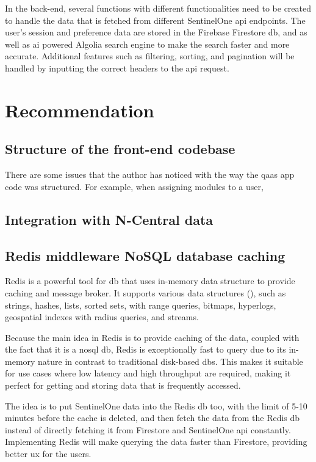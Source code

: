 \begin{multicols}{2}
  In the back-end, several functions with different functionalities need to be created to handle the data that is fetched from different
  SentinelOne \acrshort{api} endpoints. The user's session and preference data are stored in the Firebase Firestore \acrshort{db}, and as
  well as \acrshort{ai} powered Algolia search engine to make the search faster and more accurate. Additional features such as filtering,
  sorting, and pagination will be handled by inputting the correct headers to the \acrshort{api} request.

  \section{Recommendation}

  \subsection{Structure of the front-end codebase}

  There are some issues that the author has noticed with the way the \acrshort{qaas} app code was structured. For example, when
  assigning modules to a user,


  \subsection{Integration with N-Central data}

  \subsection{Redis middleware NoSQL database caching}
  Redis is a powerful tool for \acrshort{db} that uses in-memory data structure to provide caching and message broker. It supports
  various data structures (\textit{\cite{redisDataStructure}}), such as strings, hashes, lists, sorted sets, with range queries,
  bitmaps, hyperlogs, geospatial indexes with radius queries, and streams.

  Because the main idea in Redis is to provide caching of the data, coupled with the fact that it is a \acrshort{nosql} \acrshort{db},
  Redis is exceptionally fast to query due to its in-memory nature in contrast to traditional disk-based \acrshort{db}s. This makes it
  suitable for use cases where low latency and high throughput are required, making it perfect for getting and storing data that is
  frequently accessed.

  The idea is to put SentinelOne data into the Redis \acrshort{db} too, with the limit of 5-10 minutes before the cache is deleted,
  and then fetch the data from the Redis \acrshort{db} instead of directly fetching it from Firestore and SentinelOne \acrshort{api}
  constantly. Implementing Redis will make querying the data faster than Firestore, providing better \acrshort{ux} for the users.


\end{multicols}
